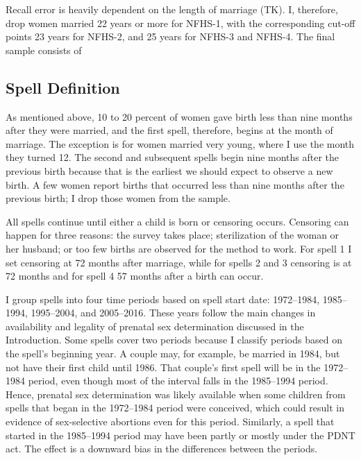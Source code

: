 \documentclass[12pt,letterpaper]{article}
\begin{document}
Recall error is heavily dependent on the length of marriage (TK).
I, therefore, drop women married 22 years or more 
for NFHS-1, with the corresponding cut-off points 23 years for NFHS-2, 
and 25 years for NFHS-3 and NFHS-4.
The final sample consists of 



\subsection{Spell Definition\label{sec:spell_def}}

As mentioned above, 10 to 20 percent of women gave birth less than nine months
after they were married, and the first spell, therefore, begins at the 
month of marriage.
The exception is for women married very young, where I use the month they 
turned 12.
The second and subsequent spells begin nine months after the previous birth 
because that is the earliest we should expect to observe a new birth.
A few women report births that occurred less than nine months 
after the previous birth; I drop those women from the sample.

All spells continue until either a child is born or censoring occurs.
Censoring can happen for three reasons:
the survey takes place;
sterilization of the woman or her husband;
or too few births are observed for the method to work.
For spell 1 I set censoring at 72 months after marriage,
while for spells 2 and 3 censoring is at 72 months and for spell 4
57 months after a birth can occur. 

I group spells into four time periods based on spell start date:
1972--1984, 1985--1994, 1995--2004, and 2005--2016.
These years follow the main changes in availability and legality of 
prenatal sex determination discussed in the Introduction.
Some spells cover two periods because I classify periods based on the 
spell's beginning year.
A couple may, for example, be married in 1984, but not have their first 
child until 1986.
That couple's first spell will be in the 1972--1984 period, even though 
most of the interval falls in the 1985--1994 period.
Hence, prenatal sex determination was likely available when some
children from spells that began in the 1972--1984 period were conceived,
which could result in evidence of sex-selective abortions even for this
period.
Similarly, a spell that started in the 1985--1994 period may have been partly 
or mostly under the PDNT act.
The effect is a downward bias in the differences between the periods.
\end{document}
